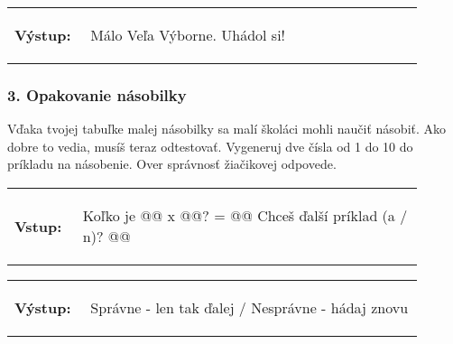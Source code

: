\vspace{-2em}
\begin{tabular}{@{}p{0.15\linewidth}p{0.75\linewidth}}
\textbf{\small Výstup:} &
\vspace{-3em}
\begin{code}
Málo
Veľa
Výborne. Uhádol si!
\end{code}
\end{tabular}
\vspace{-2em}

\subsubsection*{3. Opakovanie násobilky}
Vďaka tvojej tabuľke malej násobilky sa malí školáci mohli naučiť násobiť. Ako dobre to vedia, musíš teraz odtestovať. Vygeneruj dve čísla od 1 do 10 do príkladu na násobenie. Over správnosť žiačikovej odpovede.

\begin{tabular}{@{}p{0.15\linewidth}p{0.75\linewidth}}
\textbf{\small Vstup:} &
\vspace{-3em}
\begin{code}
Koľko je @\fbox{\phantom{vstup}}@ x @\fbox{\phantom{vstup}}@?
= @\fbox{\phantom{vstup}}@
Chceš ďalší príklad (a / n)?  @\fbox{\phantom{vstup}}@
\end{code}
\end{tabular}

\vspace{-2em}
\begin{tabular}{@{}p{0.15\linewidth}p{0.75\linewidth}}
\textbf{\small Výstup:} &
\vspace{-3em}
\begin{code}
Správne - len tak ďalej / Nesprávne - hádaj znovu
\end{code}
\end{tabular}
\vspace{-2em}
